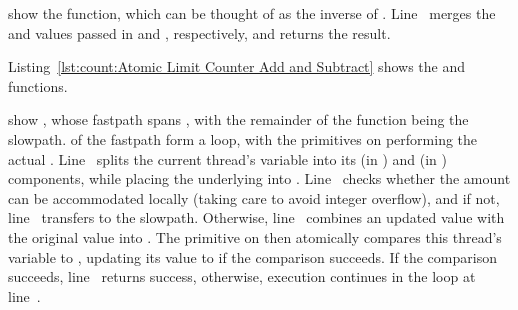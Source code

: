 \QuickQuizEnd

\begin{fcvref}
 show the  function, which
can be thought of as the inverse of .
Line~ merges the  and 
values passed in  and , respectively, and returns
the result.
\end{fcvref}

\QuickQuizEnd

\begin{listing}[tbp]

\caption{Atomic Limit Counter Add and Subtract}
\label{lst:count:Atomic Limit Counter Add and Subtract}
\end{listing}

Listing~\ref{lst:count:Atomic Limit Counter Add and Subtract}
shows the  and  functions.

\begin{fcvref}
 show , whose fastpath spans
,
with the remainder of the function being the slowpath.
 of the fastpath form a  loop, with
the  primitives on
 performing the
actual .
Line~ splits the current thread's  variable into its
 (in ) and  (in ) components,
while placing the underlying  into .
Line~ checks whether the amount  can be accommodated
locally (taking care to avoid integer overflow), and if not,
line~ transfers to the slowpath.
Otherwise, line~ combines an updated  value with the
original  value into .
The  primitive on
 then atomically
compares this thread's  variable to ,
updating its value to  if the comparison succeeds.
If the comparison succeeds, line~ returns success, otherwise,
execution continues in the loop at line~.
\end{fcvref}

